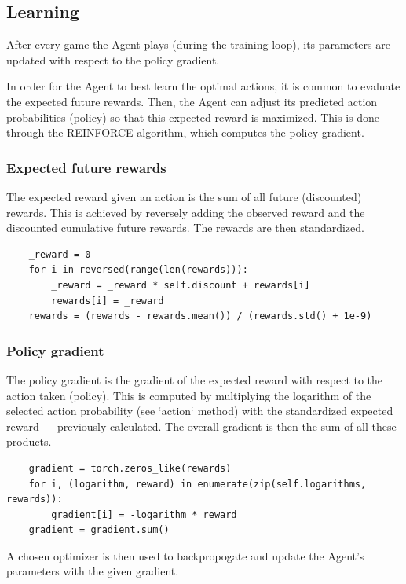 \documentclass{article}
\renewenvironment{leftbar}[1][\hsize]{
    \def\FrameCommand{{\color{barcolor}\vrule width 2pt \hspace{10pt}}}
    \MakeFramed{\hsize#1 \advance\hsize-\width \FrameRestore}
}{\endMakeFramed}
\begin{document}
\subsection*{Learning}
\begin{leftbar}
    After every game the Agent plays (during the training-loop), its parameters are updated with respect to the policy gradient.
    
    In order for the Agent to best learn the optimal actions, it is common to evaluate the expected future rewards. Then, the Agent can adjust its predicted action probabilities (policy) so that this expected reward is maximized. This is done through the REINFORCE algorithm, which computes the policy gradient.

    \subsubsection*{Expected future rewards}

    The expected reward given an action is the sum of all future (discounted) rewards. This is achieved by reversely adding the observed reward and the discounted cumulative future rewards. The rewards are then standardized.
    
    \begin{lstlisting}
    _reward = 0
    for i in reversed(range(len(rewards))):
        _reward = _reward * self.discount + rewards[i]
        rewards[i] = _reward
    rewards = (rewards - rewards.mean()) / (rewards.std() + 1e-9)
    \end{lstlisting}

    \subsubsection*{Policy gradient}

    The policy gradient is the gradient of the expected reward with respect to the action taken (policy). This is computed by multiplying the logarithm of the selected action probability (see `action` method) with the standardized expected reward — previously calculated. The overall gradient is then the sum of all these products.
    
    \begin{lstlisting}
    gradient = torch.zeros_like(rewards)
    for i, (logarithm, reward) in enumerate(zip(self.logarithms, rewards)):
        gradient[i] = -logarithm * reward            
    gradient = gradient.sum()
    \end{lstlisting}
    
    A chosen optimizer is then used to backpropogate and update the Agent's parameters with the given gradient.
\end{leftbar}
\end{document}
